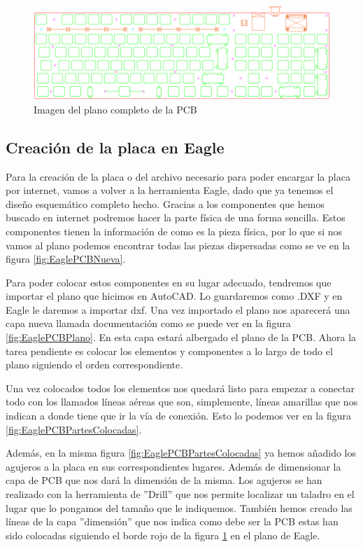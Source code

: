 \begin{figure}[H]
    \centering
    \includegraphics[width=1\textwidth]{imagenes/Capitulos/Cap05/PlanoConPartes.png}
    \caption{Imagen del plano completo de la \gls{PCB}}
    \label{fig:PlanoPCBConTodo}
\end{figure}

\subsection{Creación de la placa en Eagle}

Para la creación de la placa o del archivo necesario para poder encargar la placa por internet, vamos a volver a la herramienta Eagle, dado que ya tenemos el diseño esquemático completo hecho. Gracias a los componentes que hemos buscado en internet podremos hacer la parte física de una forma sencilla. Estos componentes tienen la información de como es la pieza física, por lo que si nos vamos al plano podemos encontrar todas las piezas dispersadas como se ve en la figura \ref{fig:EaglePCBNueva}.

Para poder colocar estos componentes en su lugar adecuado, tendremos que importar el plano que hicimos en AutoCAD. Lo guardaremos como .DXF y en Eagle le daremos a importar dxf. Una vez importado el plano nos aparecerá una capa nueva llamada documentación como se puede ver en la figura \ref{fig:EaglePCBPlano}. En esta capa estará albergado el plano de la \gls{PCB}. Ahora la tarea pendiente es colocar los elementos y componentes a lo largo de todo el plano siguiendo el orden correspondiente.

Una vez colocados todos los elementos nos quedará listo para empezar a conectar todo con los llamados líneas aéreas que son, simplemente, líneas amarillas que nos indican a donde tiene que ir la vía de conexión. Esto lo podemos ver en la figura \ref{fig:EaglePCBPartesColocadas}. 

Además, en la misma figura \ref{fig:EaglePCBPartesColocadas} ya hemos añadido los agujeros a la placa en sus correspondientes lugares. Además de dimensionar la capa de \gls{PCB} que nos dará la dimensión de la misma. Los agujeros se han realizado con la herramienta de ''Drill'' que nos permite localizar un taladro en el lugar que lo pongamos del tamaño que le indiquemos. También hemos creado las líneas de la capa ''dimensión'' que nos indica como debe ser la \gls{PCB} estas han sido colocadas siguiendo el borde rojo de la figura \ref{fig:PlanoPCBConTodo} en el plano de Eagle.


